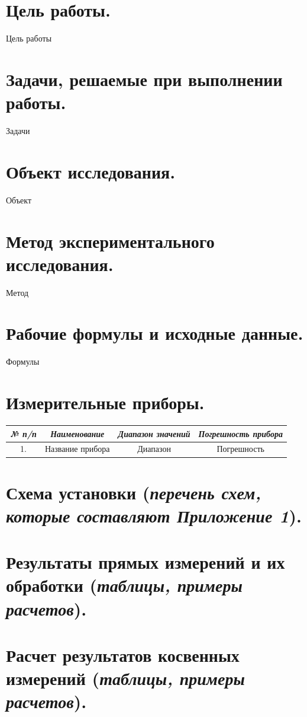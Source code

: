 \begin{flushleft}
\section{Цель работы.}
Цель работы

\section{Задачи, решаемые при выполнении работы.}
Задачи

\section{Объект исследования.}
Объект

\section{Метод экспериментального исследования.}
Метод

\section{Рабочие формулы и исходные данные.}
Формулы

\section{Измерительные приборы.}
\small
\begin{tabular}{|c|c|c|c|}
    \hline
    \textit{№ п/п} 
     & \textit{Наименование} 
     & \textit{Диапазон значений}
     & \textit{Погрешность прибора} \\
     \hline
     1. & Название прибора & Диапазон & Погрешность\\
     \hline
\end{tabular}

\section{Схема установки (\textit{перечень схем, которые составляют Приложение 1}).}


\section{Результаты прямых измерений и их обработки (\textit{таблицы, примеры расчетов}).}

\section{Расчет результатов косвенных измерений (\textit{таблицы, примеры расчетов}).}


\end{flushleft}
